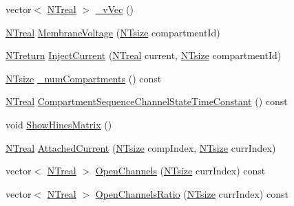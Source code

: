 \begin{DoxyCompactItemize}
vector$<$ \hyperlink{nt__types_8h_a814a97893e9deb1eedcc7604529ba80d}{NTreal} $>$ \hyperlink{class_n_t_b_p__membrane__compartment__sequence__o_ad89ec8bea6c4a15a83346d7f4750c148}{\_\-vVec} ()
\item 
\hyperlink{nt__types_8h_a814a97893e9deb1eedcc7604529ba80d}{NTreal} \hyperlink{class_n_t_b_p__membrane__compartment__sequence__o_a611344df324ed7867c901e3a920f4548}{MembraneVoltage} (\hyperlink{nt__types_8h_a06c124f2e4469769b58230253ce0560b}{NTsize} compartmentId)
\item 
\hyperlink{nt__types_8h_ab9564ee8f091e809d21b8451c6683c53}{NTreturn} \hyperlink{class_n_t_b_p__membrane__compartment__sequence__o_a11bb60e265ec689806413765d6b7d9cc}{InjectCurrent} (\hyperlink{nt__types_8h_a814a97893e9deb1eedcc7604529ba80d}{NTreal} current, \hyperlink{nt__types_8h_a06c124f2e4469769b58230253ce0560b}{NTsize} compartmentId)
\item 
\hyperlink{nt__types_8h_a06c124f2e4469769b58230253ce0560b}{NTsize} \hyperlink{class_n_t_b_p__membrane__compartment__sequence__o_afc1f6bfeb6f1071e943f20201bd31c4a}{\_\-numCompartments} () const 
\item 
\hyperlink{nt__types_8h_a814a97893e9deb1eedcc7604529ba80d}{NTreal} \hyperlink{class_n_t_b_p__membrane__compartment__sequence__o_aaf26a6c117eca49b129031238bdc305e}{CompartmentSequenceChannelStateTimeConstant} () const 
\item 
void \hyperlink{class_n_t_b_p__membrane__compartment__sequence__o_a470af324ac4d4b28d2669b1bba3f36f8}{ShowHinesMatrix} ()
\item 
\hyperlink{nt__types_8h_a814a97893e9deb1eedcc7604529ba80d}{NTreal} \hyperlink{class_n_t_b_p__membrane__compartment__sequence__o_a65b80827e745d9dfdebc7232c4a591ec}{AttachedCurrent} (\hyperlink{nt__types_8h_a06c124f2e4469769b58230253ce0560b}{NTsize} compIndex, \hyperlink{nt__types_8h_a06c124f2e4469769b58230253ce0560b}{NTsize} currIndex)
\item 
vector$<$ \hyperlink{nt__types_8h_a814a97893e9deb1eedcc7604529ba80d}{NTreal} $>$ \hyperlink{class_n_t_b_p__membrane__compartment__sequence__o_ad053a8f46fc1f7027ea834e0314bb25e}{OpenChannels} (\hyperlink{nt__types_8h_a06c124f2e4469769b58230253ce0560b}{NTsize} currIndex) const 
\item 
vector$<$ \hyperlink{nt__types_8h_a814a97893e9deb1eedcc7604529ba80d}{NTreal} $>$ \hyperlink{class_n_t_b_p__membrane__compartment__sequence__o_a0e9da39c1e1e08f17a55345d106d2e79}{OpenChannelsRatio} (\hyperlink{nt__types_8h_a06c124f2e4469769b58230253ce0560b}{NTsize} currIndex) const 
\item 

\end{DoxyCompactItemize}
